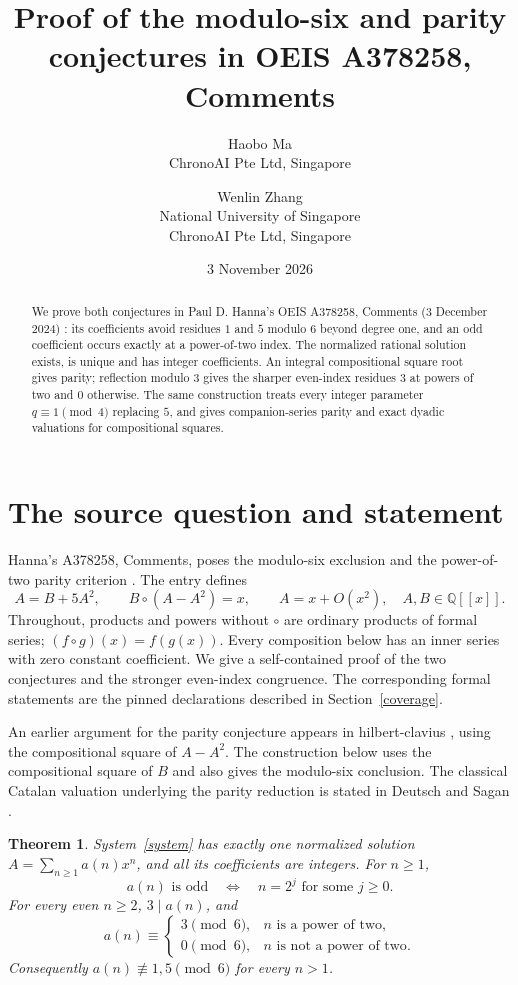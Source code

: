 \documentclass[11pt]{article}
\title{Proof of the modulo-six and parity conjectures in OEIS A378258, Comments}
\author{Haobo Ma\\\small ChronoAI Pte Ltd, Singapore
\and Wenlin Zhang\\\small National University of Singapore\\\small ChronoAI Pte Ltd, Singapore}
\date{3 November 2026}
\newtheorem{theorem}{Theorem}
\newcommand{\Q}{\mathbb Q}
\begin{document}
\maketitle
\begin{abstract}
We prove both conjectures in Paul D. Hanna's OEIS A378258, Comments (3 December 2024) \cite{hanna}: its coefficients avoid residues $1$ and $5$ modulo $6$ beyond degree one, and an odd coefficient occurs exactly at a power-of-two index. The normalized rational solution exists, is unique and has integer coefficients. An integral compositional square root gives parity; reflection modulo $3$ gives the sharper even-index residues $3$ at powers of two and $0$ otherwise. The same construction treats every integer parameter $q\equiv1\pmod4$ replacing $5$, and gives companion-series parity and exact dyadic valuations for compositional squares.
\end{abstract}

\section{The source question and statement}
Hanna's A378258, Comments, poses the modulo-six exclusion and the power-of-two parity criterion \cite{hanna}. The entry defines
\begin{equation}\label{system}
 A=B+5A^2,\qquad B\circ(A-A^2)=x,
 \qquad A=x+O(x^2),\quad A,B\in\Q[[x]].
\end{equation}
Throughout, products and powers without $\circ$ are ordinary products of formal series; $(f\circ g)(x)=f(g(x))$. Every composition below has an inner series with zero constant coefficient. We give a self-contained proof of the two conjectures and the stronger even-index congruence. The corresponding formal statements are the pinned declarations described in Section~\ref{coverage}.

An earlier argument for the parity conjecture appears in
hilbert-clavius \cite[item 5, 25 October 2026]{earlier-parity}, using the
compositional square of $A-A^2$. The construction below uses the compositional
square of $B$ and also gives the modulo-six conclusion. The classical Catalan
valuation underlying the parity reduction is stated in
Deutsch and Sagan \cite[Theorem 2.1]{deutsch-sagan}.

\begin{theorem}\label{main}
System~\eqref{system} has exactly one normalized solution $A=\sum_{n\geq1}a(n)x^n$, and all its coefficients are integers. For $n\geq1$,
\[
 a(n)\text{ is odd}\quad\Longleftrightarrow\quad n=2^j\text{ for some }j\geq0.
\]
For every even $n\geq2$, $3\mid a(n)$, and
\[
 a(n)\equiv
 \begin{cases}3\pmod 6,&n\text{ is a power of two},\\
 0\pmod 6,&n\text{ is not a power of two}.
 \end{cases}
\]
Consequently $a(n)\not\equiv1,5\pmod6$ for every $n>1$.
\end{theorem}
\end{document}
